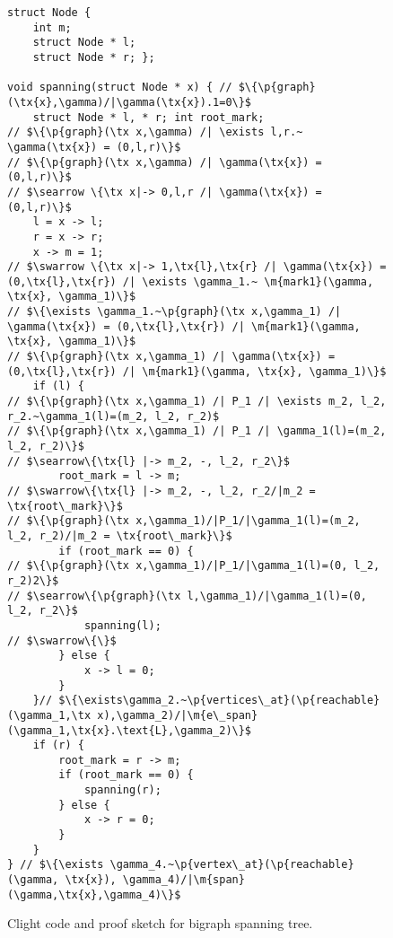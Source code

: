 \begin{figure}
  \begin{lstlisting}
struct Node {
    int m;
    struct Node * l;
    struct Node * r; };

void spanning(struct Node * x) { // $\{\p{graph}(\tx{x},\gamma)/|\gamma(\tx{x}).1=0\}$
    struct Node * l, * r; int root_mark;
// $\{\p{graph}(\tx x,\gamma) /| \exists l,r.~ \gamma(\tx{x}) = (0,l,r)\}$
// $\{\p{graph}(\tx x,\gamma) /| \gamma(\tx{x}) = (0,l,r)\}$
// $\searrow \{\tx x|-> 0,l,r /| \gamma(\tx{x}) = (0,l,r)\}$
    l = x -> l;
    r = x -> r;
    x -> m = 1;
// $\swarrow \{\tx x|-> 1,\tx{l},\tx{r} /| \gamma(\tx{x}) = (0,\tx{l},\tx{r}) /| \exists \gamma_1.~ \m{mark1}(\gamma, \tx{x}, \gamma_1)\}$
// $\{\exists \gamma_1.~\p{graph}(\tx x,\gamma_1) /| \gamma(\tx{x}) = (0,\tx{l},\tx{r}) /| \m{mark1}(\gamma, \tx{x}, \gamma_1)\}$
// $\{\p{graph}(\tx x,\gamma_1) /| \gamma(\tx{x}) = (0,\tx{l},\tx{r}) /| \m{mark1}(\gamma, \tx{x}, \gamma_1)\}$
    if (l) {
// $\{\p{graph}(\tx x,\gamma_1) /| P_1 /| \exists m_2, l_2, r_2.~\gamma_1(l)=(m_2, l_2, r_2)$
// $\{\p{graph}(\tx x,\gamma_1) /| P_1 /| \gamma_1(l)=(m_2, l_2, r_2)\}$
// $\searrow\{\tx{l} |-> m_2, -, l_2, r_2\}$
        root_mark = l -> m;
// $\swarrow\{\tx{l} |-> m_2, -, l_2, r_2/|m_2 = \tx{root\_mark}\}$
// $\{\p{graph}(\tx x,\gamma_1)/|P_1/|\gamma_1(l)=(m_2, l_2, r_2)/|m_2 = \tx{root\_mark}\}$
        if (root_mark == 0) {
// $\{\p{graph}(\tx x,\gamma_1)/|P_1/|\gamma_1(l)=(0, l_2, r_2)2\}$
// $\searrow\{\p{graph}(\tx l,\gamma_1)/|\gamma_1(l)=(0, l_2, r_2\}$
            spanning(l);
// $\swarrow\{\}$
        } else {
            x -> l = 0;
        }
    }// $\{\exists\gamma_2.~\p{vertices\_at}(\p{reachable}(\gamma_1,\tx x),\gamma_2)/|\m{e\_span}(\gamma_1,\tx{x}.\text{L},\gamma_2)\}$
    if (r) {
        root_mark = r -> m;
        if (root_mark == 0) {
            spanning(r);
        } else {
            x -> r = 0;
        }
    }
} // $\{\exists \gamma_4.~\p{vertex\_at}(\p{reachable}(\gamma, \tx{x}), \gamma_4)/|\m{span}(\gamma,\tx{x},\gamma_4)\}$
\end{lstlisting}

\caption{Clight code and proof sketch for bigraph spanning tree.}
\label{fig:spanning}

\end{figure}